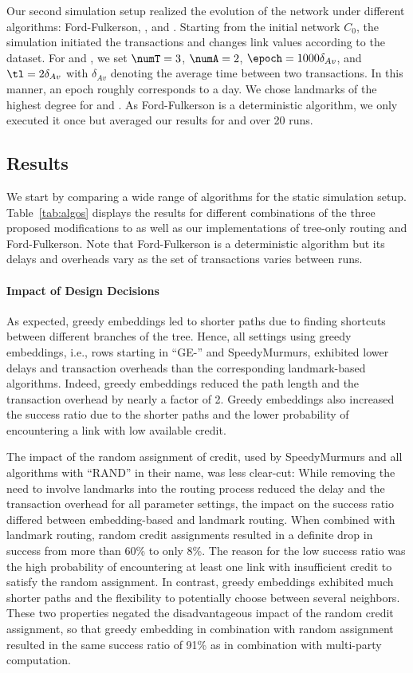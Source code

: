 Our second simulation setup realized the evolution of the network under different algorithms: Ford-Fulkerson, \cnsysname , and \oursys .
Starting from the initial network $C_0$, the simulation initiated the transactions and changes link values according to the dataset.
For \cnsysname and \oursys , we set $\numT=3$, $\numA=2$, $\epoch=1000\delta_{Av}$, and $\tl=2\delta_{Av}$
with $\delta_{Av}$ denoting the average time between two transactions. In this manner, an epoch roughly corresponds to a day. 
We chose landmarks of the highest degree for \oursys and \cnsysname.
As Ford-Fulkerson is a deterministic algorithm, we only executed it once but averaged our results for \oursys and \cnsysname over 20 runs.
     
     

\subsection{Results}

We start by comparing a wide range of algorithms for the static simulation setup.
Table~\ref{tab:algos} displays the results for different combinations of the three proposed modifications to \cnsysname  as well as our implementations of tree-only routing and Ford-Fulkerson. 
Note that Ford-Fulkerson is a deterministic algorithm but its delays and overheads vary as the set of transactions varies between runs. 

\paragraph*{Impact of Design Decisions} 
As expected, greedy embeddings led to shorter paths due to finding shortcuts between different branches of the tree. Hence, all settings using greedy embeddings, i.e., rows starting in ``GE-'' and SpeedyMurmurs, exhibited lower delays and transaction overheads than the corresponding landmark-based algorithms. Indeed, greedy embeddings reduced the path length and the transaction overhead by nearly a factor of 2.
Greedy embeddings also increased the success ratio due to the shorter paths and the lower probability of encountering a link with low available credit.

The impact of the random assignment of credit, used by SpeedyMurmurs and all algorithms with ``RAND'' in their name, was less clear-cut: While removing the need to involve landmarks into the routing process reduced the delay and the transaction overhead for all parameter settings, the impact on the success ratio differed between embedding-based and landmark routing. 
When combined with landmark routing, random credit assignments resulted in a definite drop in success from more than 60\% to only 8\%. The reason for the low success ratio was the high probability of encountering at least one link with insufficient credit to satisfy the random assignment.
In contrast, greedy embeddings exhibited much shorter paths and the flexibility to potentially choose between several neighbors. These two properties negated the disadvantageous impact of the random credit assignment, so that greedy embedding in combination with random assignment resulted in the same success ratio of 91\% as in combination with multi-party computation. 

